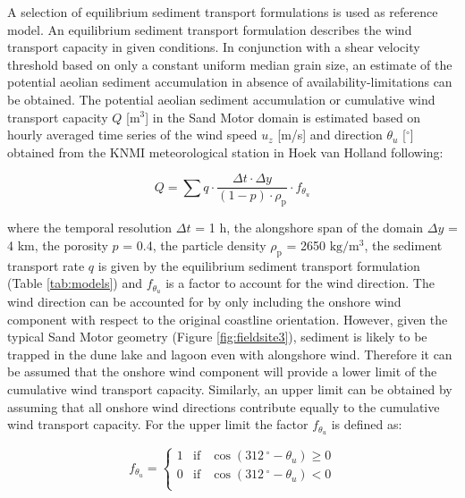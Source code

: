 \documentclass[preprint,12pt,authoryear]{elsarticle}
\begin{document}
A selection of equilibrium sediment transport formulations is used as
reference model. An equilibrium sediment transport formulation
describes the wind transport capacity in given conditions. In
conjunction with a shear velocity threshold based on only a constant
uniform median grain size, an estimate of the potential aeolian
sediment accumulation in absence of availability-limitations can be
obtained. The potential aeolian sediment accumulation or cumulative
wind transport capacity $Q$ [$\mathrm{m^3}$] in the Sand Motor domain
is estimated based on hourly averaged time series of the wind speed
$u_z$ [m/s] and direction $\theta_u$ [$^{\circ}$] obtained from the
KNMI meteorological station in Hoek van Holland following:

\begin{equation}
  \label{eq:transport_capacity}
  Q = \sum q \cdot \frac{\Delta t \cdot \Delta y}{(1 - p) \cdot \rho_{\mathrm{p}}} \cdot f_{\theta_u}
\end{equation}

\noindent where the temporal resolution $\Delta t$ = 1 h, the
alongshore span of the domain $\Delta y$ = 4 km, the porosity $p$ =
0.4, the particle density $\rho_{\mathrm{p}}$ = 2650
$\mathrm{kg/m^3}$, the sediment transport rate $q$ is given by the
equilibrium sediment transport formulation (Table \ref{tab:models})
and $f_{\theta_u}$ is a factor to account for the wind direction. The
wind direction can be accounted for by only including the onshore wind
component with respect to the original coastline orientation. However,
given the typical Sand Motor geometry (Figure \ref{fig:fieldsite3}),
sediment is likely to be trapped in the dune lake and lagoon even with
alongshore wind. Therefore it can be assumed that the onshore wind
component will provide a lower limit of the cumulative wind transport
capacity. Similarly, an upper limit can be obtained by assuming that
all onshore wind directions contribute equally to the cumulative wind
transport capacity. For the upper limit the factor $f_{\theta_u}$ is
defined as:

\begin{equation}
  f_{\theta_u} = \left\{
      \begin{array}{rcl}
        1 & \mathrm{if} & \cos \left( 312\,^{\circ} - \theta_u \right) \geq 0 \\
        0 & \mathrm{if} & \cos \left( 312\,^{\circ} - \theta_u \right) < 0 \\
      \end{array}
    \right.
\end{equation}
\end{document}
